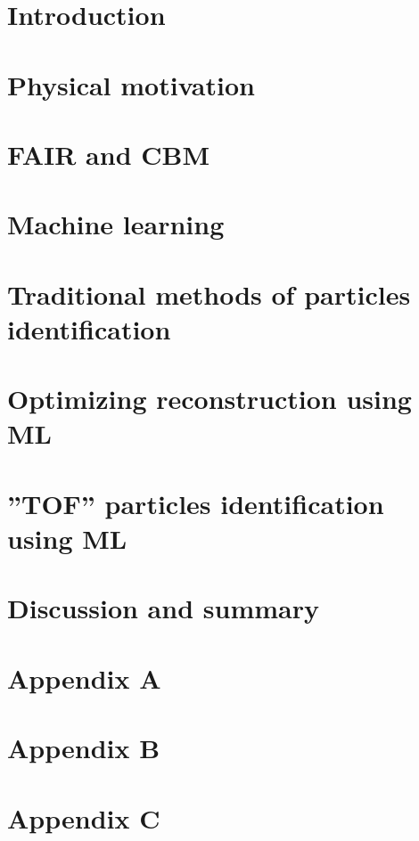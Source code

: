 \documentclass[12pt,a4paper,twoside]{book}
\numberwithin{equation}{chapter} %
\begin{document}


\tableofcontents
{}
\pagestyle{empty}

\chapter{Introduction}
\thispagestyle{fancy}


\chapter{Physical motivation}
\thispagestyle{fancy}

\chapter{FAIR and CBM}

\chapter{Machine learning}

\chapter{Traditional methods of particles identification}

\chapter{Optimizing \PKshort reconstruction using ML}

\chapter{''TOF'' particles identification using ML}

\chapter{Discussion and summary}



\listoffigures
\thispagestyle{fancy}

\listoftables
\thispagestyle{fancy}

\chapter{Appendix A}

\chapter{Appendix B}

\chapter{Appendix C}

\end{document}
